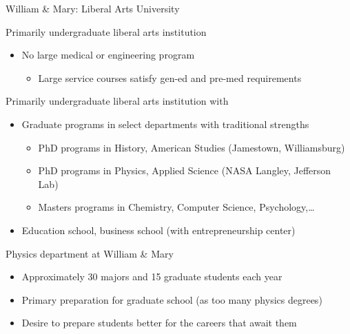 \documentclass[xcolor=table,compress,professionalfonts,pdfpagelabels]{beamer}
\begin{document}
\begin{frame}{William \& Mary: Liberal Arts University}
 \begin{block}{Primarily undergraduate liberal arts institution}
  \begin{itemize}
   \item No large medical or engineering program
   \begin{itemize}
    \item Large service courses satisfy gen-ed and pre-med requirements
   \end{itemize}
  \end{itemize}
 \end{block}
 \begin{block}{Primarily undergraduate liberal arts institution with}
  \begin{itemize}
   \item Graduate programs in select departments with traditional strengths
    \begin{itemize}
     \item PhD programs in History, American Studies (Jamestown, Williamsburg)
     \item PhD programs in Physics, Applied Science (NASA Langley, Jefferson Lab)
     \item Masters programs in Chemistry, Computer Science, Psychology,\ldots
    \end{itemize}
   \item Education school, business school (with entrepreneurship center)
  \end{itemize}
 \end{block}
 \begin{block}{Physics department at William \& Mary}
  \begin{itemize}
   \item Approximately 30 majors and 15 graduate students each year
   \item Primary preparation for graduate school (as too many physics degrees)
   \item Desire to prepare students better for the careers that await them
  \end{itemize}
 \end{block}
\end{frame}
\end{document}
